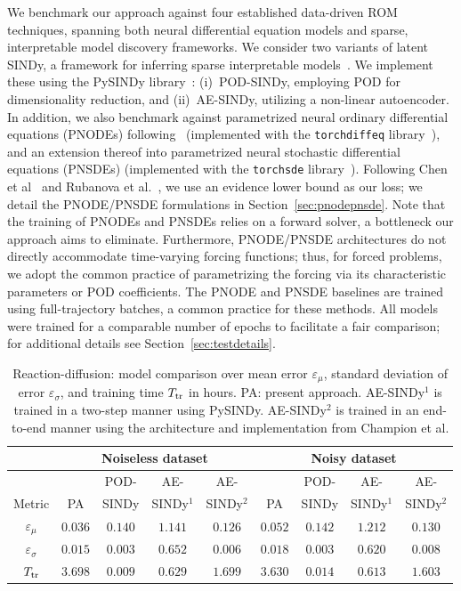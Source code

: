 \documentclass{article}
\begin{document}
	We benchmark our approach against four established data-driven ROM techniques, spanning both neural differential equation models and sparse, interpretable model discovery frameworks. We consider two variants of latent SINDy, a framework for inferring sparse interpretable models~\cite{Conti_2023_ROM_Parametrized_SINDy,Nicolaou_2023_Data_Driven_Parametrized}. We implement these using the PySINDy library~\cite{De_Silva_2020_PySINDy,Kaptanoglu_2022_PySINDy}: (i)~POD-SINDy, employing POD for dimensionality reduction, and (ii)~AE-SINDy, utilizing a non-linear autoencoder. In addition, we also benchmark against parametrized neural ordinary differential equations (PNODEs) following~\cite{Lee_2021_Parameterized_Neural_ODE_ROM} (implemented with the \verb|torchdiffeq| library~\cite{Chen_2018_NODEs}), and an extension thereof into parametrized neural stochastic differential equations (PNSDEs) (implemented with the \verb|torchsde| library~\cite{Li_2020_Scalable_Gradients_VI_SDE}). Following Chen et al~\cite{Chen_2018_NODEs} and Rubanova et al.~\cite{Rubanova_2019_NODE}, we use an evidence lower bound as our loss; we detail the PNODE/PNSDE formulations in Section~\ref{sec:pnodepnsde}. Note that the training of PNODEs and PNSDEs relies on a forward solver, a bottleneck our approach aims to eliminate. Furthermore, PNODE/PNSDE architectures do not directly accommodate time-varying forcing functions; thus, for forced problems, we adopt the common practice of parametrizing the forcing via its characteristic parameters or POD coefficients.
	The PNODE and PNSDE baselines are trained using full-trajectory batches, a common practice for these methods. All models were trained for a comparable number of epochs to facilitate a fair comparison; for additional details see Section~\ref{sec:testdetails}.
	
	\begin{table}[t]
		\centering
		\caption{Reaction-diffusion: model comparison over mean error $\varepsilon_\mu$, standard deviation of error $\varepsilon_\sigma$, and training time $T_{\rm tr}$ in hours. PA: present approach. AE-SINDy$^1$ is trained in a two-step manner using PySINDy. AE-SINDy$^2$ is trained in an end-to-end manner using the architecture and implementation from Champion et al.}
		\label{tab:reactiondiffusion_comparison}
		\begin{tabular}{c|cccc|cccc}
			\toprule
			& \multicolumn{4}{c|}{Noiseless dataset}
			& \multicolumn{4}{c}{Noisy dataset} \\
			\midrule
			& & POD- & AE- & AE- & & POD- & AE- & AE- \\
			Metric & PA & SINDy & SINDy$^1$ & SINDy$^2$ & PA & SINDy & SINDy$^1$ & SINDy$^2$ \\
			\midrule
			$\varepsilon_\mu$ & $0.036$ & $0.140$ & $1.141$ & $0.126$ & $0.052$ & $0.142$ & $1.212$ & $0.130$ \\
			$\varepsilon_\sigma$ & $0.015$ & $0.003$ & $0.652$ & $0.006$ & $0.018$ & $0.003$ & $0.620$ & $0.008$ \\
			$T_{\rm tr}$ & $3.698$ & $0.009$ & $0.629$ & $1.699$ & $3.630$ & $0.014$ & $0.613$ & $1.603$ \\
			\bottomrule
		\end{tabular}
	\end{table}
	
\end{document}
